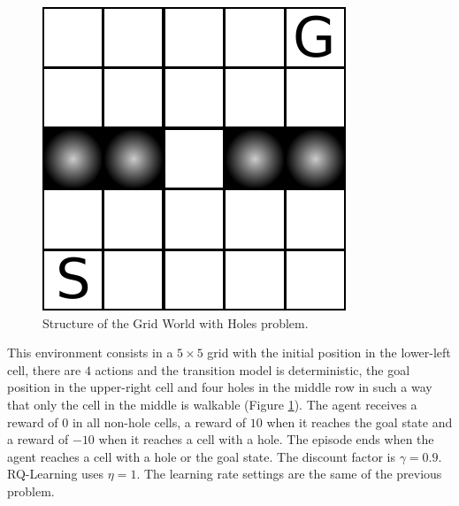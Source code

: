 \begin{figure}[t]
\centering
\includegraphics[scale=.55]{./img/gridhole.pdf}
\caption[Structure of the Grid World with Holes problem.]{Structure of the Grid World with Holes problem.}
  \label{F:grid_hole_map}
\end{figure}
This environment consists in a $5 \times 5$ grid with the initial position in the lower-left cell, there are $4$ actions and the transition model is deterministic, the goal position in the upper-right cell and four holes in the middle row in such a way that only the cell in the middle is walkable (Figure \ref{F:grid_hole_map}). The agent receives a reward of $0$ in all non-hole cells, a reward of $10$ when it reaches the goal state and a reward of $-10$ when it reaches a cell with a hole. The episode ends when the agent reaches a cell with a hole or the goal state. The discount factor is $\gamma = 0.9$. RQ-Learning uses $\eta = 1$.
The learning rate settings are the same of the previous problem.

